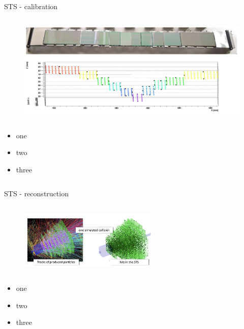 \begin{columnframe}{STS - calibration}
    \begin{column}{0.5\textwidth}
        \begin{figure}
            \centering
            \includegraphics[width=\textwidth, frame]{images/sts_strips.png}
        \end{figure}
    \end{column}
    \begin{column}{0.5\textwidth}
        \begin{itemize}
            \item one
            \item two
            \item three
        \end{itemize}
    \end{column}
\end{columnframe}

\begin{columnframe}{STS - reconstruction}
    \begin{column}{0.5\textwidth}
        \begin{figure}
            \centering
            \includegraphics[width=0.6\textwidth, frame]{images/sts_reco.png}
        \end{figure}
    \end{column}
    \begin{column}{0.5\textwidth}
        \begin{itemize}
            \item one
            \item two
            \item three
        \end{itemize}
    \end{column}
\end{columnframe}

